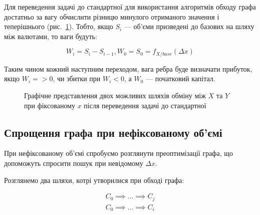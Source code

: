 \documentclass[../index.tex]{subfiles}
\begin{document}
Для переведення задачі до стандартної для використання алгоритмів обходу графа
достатньо за вагу обчислити різницю минулого отриманого значення і теперішнього
(рис.~\ref{fig:eval-func-graph-weight}). Тобто, якщо $S_{i}$ --- об'єми призведені
до базових на шляху між валютами, то ваги будуть:

\begin{equation*}
W_{i} = S_{i} - S_{i-1}, W_{0} = S_{0} = f_{X/base}(\Delta x)
\end{equation*}

Таким чином кожний наступним переходом, вага ребра буде визначати прибуток, якщо
$W_{i} => 0$, чи збитки при $W_{i} < 0$, а $W_{0}$ --- початковий капітал.

\begin{figure}[h]
	\centering
	\caption{\label{fig:eval-func-graph-weight} Графічне представлення двох
	  можливих шляхів обміну між $X$ та $Y$ при фіксованому $x$ після
	  переведення задачі до стандартної}
\end{figure}

\subsection{Спрощення графа при нефіксованому об'ємі}

При нефіксованому об'ємі спробуємо розглянути преоптимізації графа, що
допоможуть спросити пошук при невідомому $\Delta x$.

Розглянемо два шляхи, котрі утворилися при обході графа:

\begin{equation*}
 \begin{aligned}
   C_{0} \implies \ldots \implies C_{j} \\
   C_{0} \implies \ldots \implies C_{i}
 \end{aligned}
\end{equation*}
\end{document}
